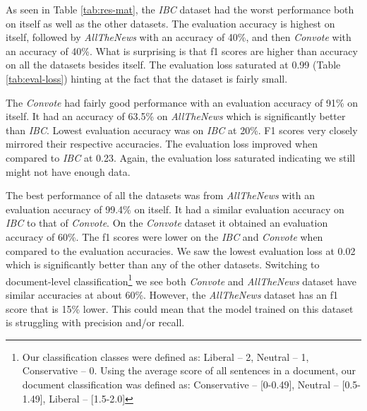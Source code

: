 \documentclass[10pt,a4paper,onecolumn]{article}
\begin{document}
As seen in Table \ref{tab:res-mat}, the \textit{IBC} dataset had the worst performance both on itself as well as the other datasets. The evaluation accuracy is highest on itself, followed by \textit{AllTheNews} with an accuracy of 40\%, and then \textit{Convote} with an accuracy of 40\%. What is surprising is that f1 scores are higher than accuracy on all the datasets besides itself. The evaluation loss saturated at 0.99 (Table \ref{tab:eval-loss}) hinting at the fact that the dataset is fairly small.

The \textit{Convote} had fairly good performance with an evaluation accuracy of 91\% on itself. It had an accuracy of 63.5\% on \textit{AllTheNews} which is significantly better than \textit{IBC}. Lowest evaluation accuracy was on \textit{IBC} at 20\%. F1 scores very closely mirrored their respective accuracies. The evaluation loss improved when compared to \textit{IBC} at 0.23. Again, the evaluation loss saturated indicating we still might not have enough data.

The best performance of all the datasets was from \textit{AllTheNews} with an evaluation accuracy of 99.4\% on itself. It had a similar evaluation accuracy on \textit{IBC} to that of \textit{Convote}. On the \textit{Convote} dataset it obtained an evaluation accuracy of 60\%. The f1 scores were lower on the \textit{IBC} and \textit{Convote} when compared to the evaluation accuracies. We saw the lowest evaluation loss at 0.02 which is significantly better than any of the other datasets. Switching to document-level classification\footnote{Our classification classes were defined as: Liberal -- 2, Neutral -- 1, Conservative -- 0. Using the average score of all sentences in a document, our document classification was defined as: Conservative -- [0-0.49], Neutral -- [0.5-1.49], Liberal -- [1.5-2.0]} we see both \textit{Convote} and \textit{AllTheNews} dataset have similar accuracies at about 60\%. However, the \textit{AllTheNews} dataset has an f1 score that is 15\% lower. This could mean that the model trained on this dataset is struggling with precision and/or recall.
\end{document}
